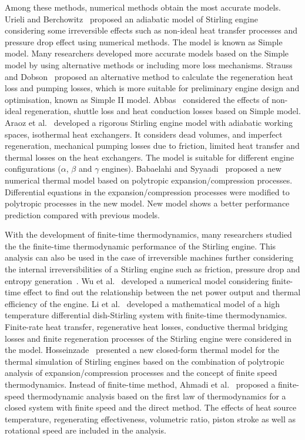 \documentclass[preprint,5p, twocolumn]{elsarticle}
\begin{document}
Among these methods, numerical methods obtain the most accurate models. Urieli and Berchowitz~\cite{Urieli1984} proposed an adiabatic model of Stirling engine considering some irreversible effects such as non-ideal heat transfer processes and pressure drop effect using numerical methods. The model is known as Simple model. Many researchers developed more accurate models based on the Simple model by using alternative methods or including more loss mechanisms. 
Strauss and Dobson~\cite{Strauss2010} proposed an alternative method to calculate the regeneration heat loss and pumping losses, which is more suitable for preliminary engine design and optimisation, known as Simple II model.
Abbas~\cite{Abbas2014} considered the effects of non-ideal regeneration, shuttle loss and heat conduction losses based on Simple model. 
Araoz et al.~\cite{Araoz2015} developed a rigorous Stirling engine model with adiabatic working spaces, isothermal heat exchangers. It considers dead volumes, and imperfect regeneration, mechanical pumping losses due to friction, limited heat transfer and thermal losses on the heat exchangers. The model is suitable for different engine configurations ($\alpha$, $\beta$ and $\gamma$ engines).
Babaelahi and Syyaadi~\cite{Babaelahi2015} proposed a new numerical thermal model based on polytropic expansion/compression processes. Differential equations in the expansion/compression processes were modified to polytropic processes in the new model. New model shows a better performance prediction compared with previous models.

With the development of finite-time thermodynamics, many researchers studied the the finite-time thermodynamic performance of the Stirling engine. This analysis can also be used in the case of irreversible machines further considering the internal irreversibilities of a Stirling engine such as friction, pressure drop and entropy generation~\cite{Barreto2017}.
Wu et al.~\cite{Wu1998} developed a numerical model considering finite-time effect to find out the relationship between the net power output and thermal efficiency of the engine. 
Li et al.~\cite{Li2011} developed a mathematical model of a high temperature differential dish-Stirling system with finite-time thermodynamics. Finite-rate heat transfer, regenerative heat losses, conductive thermal bridging losses and finite regeneration processes of the Stirling engine were considered in the model.
Hosseinzade~\cite{Hosseinzade2015} presented a new closed-form thermal model for the thermal simulation of Stirling engines based on the combination of polytropic analysis of expansion/compression processes and the concept of finite speed thermodynamics.
Instead of finite-time method, Ahmadi et al.~\cite{Ahmadi2016b} proposed a finite-speed thermodynamic analysis based on the first law of thermodynamics for a closed system with finite speed and the direct method. The effects of heat source temperature, regenerating effectiveness, volumetric ratio, piston stroke as well as rotational speed are included in the analysis.
\end{document}
